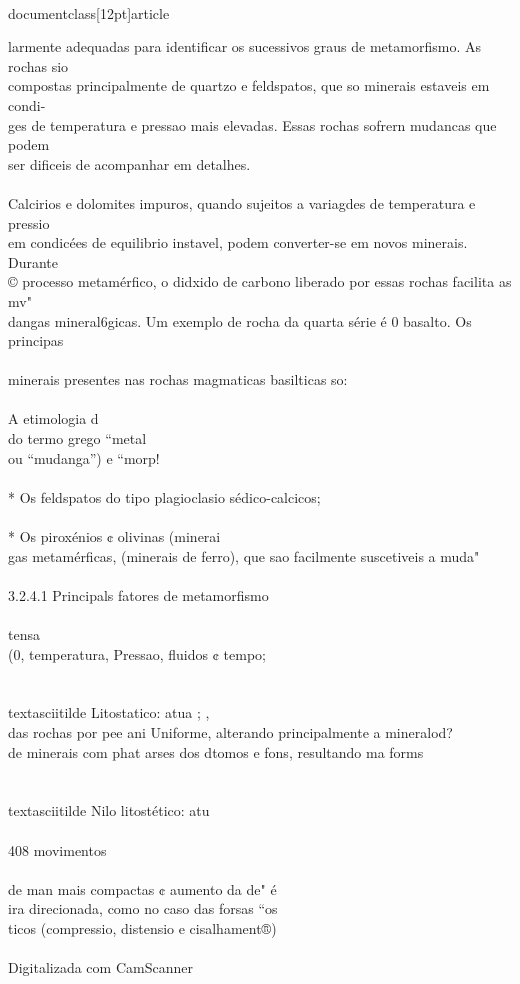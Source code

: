 \\documentclass[12pt]{article}
\begin{document}
larmente adequadas para identificar os sucessivos graus de metamorfismo. As rochas sio\\
compostas principalmente de quartzo e feldspatos, que so minerais estaveis em condi-\\
ges de temperatura e pressao mais elevadas. Essas rochas sofrern mudancas que podem\\
ser dificeis de acompanhar em detalhes.\\
\\
Calcirios e dolomites impuros, quando sujeitos a variagdes de temperatura e pressio\\
em condicées de equilibrio instavel, podem converter-se em novos minerais. Durante\\
© processo metamérfico, o didxido de carbono liberado por essas rochas facilita as mv"\\
dangas mineral6gicas. Um exemplo de rocha da quarta série é 0 basalto. Os principas\\
\\
minerais presentes nas rochas magmaticas basilticas so:\\
\\
A etimologia d\\
do termo grego “metal\\
ou “mudanga”) e “morp!\\
\\
* Os feldspatos do tipo plagioclasio sédico-calcicos;\\
\\
* Os piroxénios ¢ olivinas (minerai\\
gas metamérficas, (minerais de ferro), que sao facilmente suscetiveis a muda"\\
\\
3.2.4.1 Principals fatores de metamorfismo\\
\\
tensa\\
(0, temperatura, Pressao, fluidos ¢ tempo;\\
\\
\\textasciitilde{} Litostatico: atua ; ,\\
das rochas por pee ani Uniforme, alterando principalmente a mineralod?\\
de minerais com phat arses dos dtomos e fons, resultando ma forms\\
\\
\\textasciitilde{} Nilo litostético: atu\\
\\
408 movimentos\\
\\
de man mais compactas ¢ aumento da de" é\\
ira direcionada, como no caso das forsas “os\\
ticos (compressio, distensio e cisalhament®)\\
\\
Digitalizada com CamScanner\\
\end{document}
